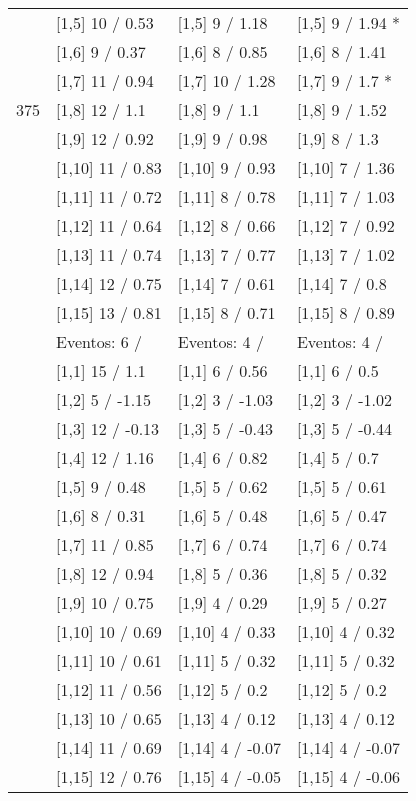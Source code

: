 \begin{table}
\begin{tabular}[t]{llll}
 & {}[1,5] 10  / 0.53 & {}[1,5] 9  / 1.18 & {}[1,5] 9  / 1.94 *\\
 & {}[1,6] 9  / 0.37 & {}[1,6] 8  / 0.85 & {}[1,6] 8  / 1.41\\
 & {}[1,7] 11  / 0.94 & {}[1,7] 10  / 1.28 & {}[1,7] 9  / 1.7 *\\
375 & {}[1,8] 12  / 1.1 & {}[1,8] 9  / 1.1 & {}[1,8] 9  / 1.52\\
\addlinespace
 & {}[1,9] 12  / 0.92 & {}[1,9] 9  / 0.98 & {}[1,9] 8  / 1.3\\
 & {}[1,10] 11  / 0.83 & {}[1,10] 9  / 0.93 & {}[1,10] 7  / 1.36\\
 & {}[1,11] 11  / 0.72 & {}[1,11] 8  / 0.78 & {}[1,11] 7  / 1.03\\
 & {}[1,12] 11  / 0.64 & {}[1,12] 8  / 0.66 & {}[1,12] 7  / 0.92\\
 & {}[1,13] 11  / 0.74 & {}[1,13] 7  / 0.77 & {}[1,13] 7  / 1.02\\
\addlinespace
 & {}[1,14] 12  / 0.75 & {}[1,14] 7  / 0.61 & {}[1,14] 7  / 0.8\\
 & {}[1,15] 13  / 0.81 & {}[1,15] 8  / 0.71 & {}[1,15] 8  / 0.89\\
 & Eventos:  6 / & Eventos:  4 / & Eventos:  4 /\\
 & {}[1,1] 15  / 1.1 & {}[1,1] 6  / 0.56 & {}[1,1] 6  / 0.5\\
 & {}[1,2] 5  / -1.15 & {}[1,2] 3  / -1.03 & {}[1,2] 3  / -1.02\\
\addlinespace
 & {}[1,3] 12  / -0.13 & {}[1,3] 5  / -0.43 & {}[1,3] 5  / -0.44\\
 & {}[1,4] 12  / 1.16 & {}[1,4] 6  / 0.82 & {}[1,4] 5  / 0.7\\
 & {}[1,5] 9  / 0.48 & {}[1,5] 5  / 0.62 & {}[1,5] 5  / 0.61\\
 & {}[1,6] 8  / 0.31 & {}[1,6] 5  / 0.48 & {}[1,6] 5  / 0.47\\
 & {}[1,7] 11  / 0.85 & {}[1,7] 6  / 0.74 & {}[1,7] 6  / 0.74\\
\addlinespace
500 & {}[1,8] 12  / 0.94 & {}[1,8] 5  / 0.36 & {}[1,8] 5  / 0.32\\
 & {}[1,9] 10  / 0.75 & {}[1,9] 4  / 0.29 & {}[1,9] 5  / 0.27\\
 & {}[1,10] 10  / 0.69 & {}[1,10] 4  / 0.33 & {}[1,10] 4  / 0.32\\
 & {}[1,11] 10  / 0.61 & {}[1,11] 5  / 0.32 & {}[1,11] 5  / 0.32\\
 & {}[1,12] 11  / 0.56 & {}[1,12] 5  / 0.2 & {}[1,12] 5  / 0.2\\
\addlinespace
 & {}[1,13] 10  / 0.65 & {}[1,13] 4  / 0.12 & {}[1,13] 4  / 0.12\\
 & {}[1,14] 11  / 0.69 & {}[1,14] 4  / -0.07 & {}[1,14] 4  / -0.07\\
 & {}[1,15] 12  / 0.76 & {}[1,15] 4  / -0.05 & {}[1,15] 4  / -0.06\\
\bottomrule
\end{tabular}
\end{table}
